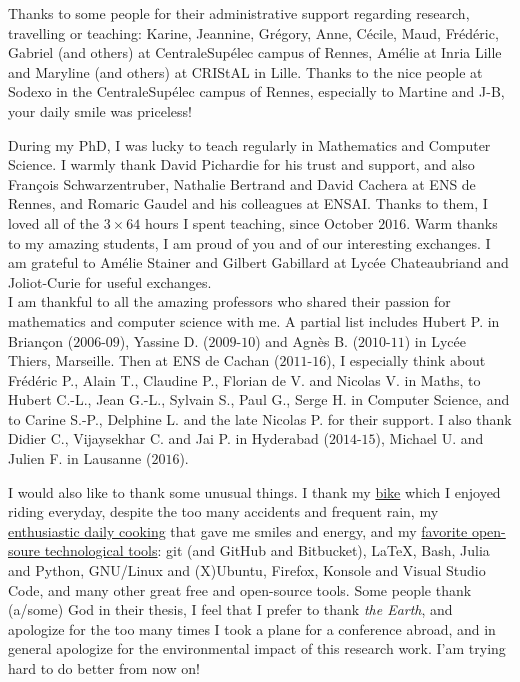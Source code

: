 \begin{acknowledgements}
Thanks to some people for their administrative support regarding research, travelling or teaching: Karine, Jeannine, Grégory, Anne, Cécile, Maud, Frédéric, Gabriel (and others) at CentraleSupélec campus of Rennes, Amélie at Inria Lille and Maryline (and others) at CRIStAL in Lille.
Thanks to the nice people at Sodexo in the CentraleSupélec campus of Rennes, especially to Martine and J-B, your daily smile was priceless!

During my PhD, I was lucky to teach regularly in Mathematics and Computer Science.
I warmly thank David Pichardie for his trust and support, and also François Schwarzentruber, Nathalie Bertrand and David Cachera at ENS de Rennes, and Romaric Gaudel and his colleagues at ENSAI. Thanks to them, I loved all of the $3 \times 64$ hours I spent teaching, since October $2016$.
Warm thanks to my amazing students, I am proud of you and of our interesting exchanges.
I am grateful to Amélie Stainer and Gilbert Gabillard at Lycée Chateaubriand and Joliot-Curie for useful exchanges.
\\
\indent
I am thankful to all the amazing professors who shared their passion for mathematics and computer science with me.
A partial list includes Hubert P. in Briançon ($2006$-$09$), Yassine D. ($2009$-$10$) and Agnès B. ($2010$-$11$) in Lycée Thiers, Marseille.
Then at ENS de Cachan ($2011$-$16$), I especially think about Frédéric P., Alain T., Claudine P., Florian de V. and Nicolas V. in Maths, to Hubert C.-L., Jean G.-L., Sylvain S., Paul G., Serge H. in Computer Science, and to Carine S.-P., Delphine L. and the late Nicolas P. for their support.
I also thank Didier C., Vijaysekhar C. and Jai P. in Hyderabad ($2014$-$15$), Michael U. and Julien F. in Lausanne ($2016$).


I would also like to thank some unusual things.
I thank my \href{https://perso.crans.org/besson/zero-dechet/}{bike} which I enjoyed riding everyday, despite the too many accidents and frequent rain, my \href{https://perso.crans.org/besson/cuisine/}{enthusiastic daily cooking} that gave me smiles and energy, and my \href{https://perso.crans.org/besson/}{favorite open-soure technological tools}: git (and GitHub and Bitbucket), \LaTeX, Bash, Julia and Python, GNU/Linux and (X)Ubuntu, Firefox, Konsole and Visual Studio Code, and many other great free and open-source tools.
Some people thank (a/some) God in their thesis, I feel that I prefer to thank \emph{the Earth}, and apologize for the too many times I took a plane for a conference abroad, and in general apologize for the environmental impact of this research work. I'am trying hard to do better from now on!



\end{acknowledgements}
